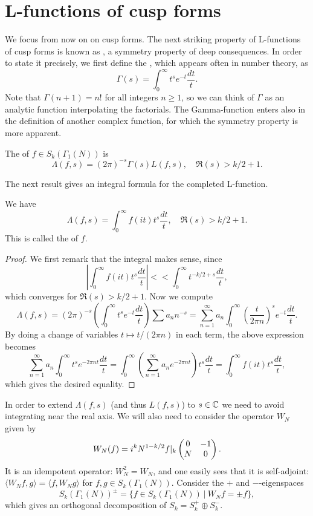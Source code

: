 \section{L-functions of cusp forms}
We focus from now on on cusp forms. The next striking property of L-functions of cusp forms is known as , a symmetry property of deep consequences. In order to state it precisely, we first define the , which appears often in number theory, as
\[
\Gamma(s)=\int_0^\infty t^s e^{-t}\frac{dt}{t}.
\]
Note that $\Gamma(n+1)= n!$ for all integers $n\geq 1$, so we can think of $\Gamma$ as an analytic function interpolating the factorials. The Gamma-function enters also in the definition of another complex function, for which the symmetry property is more apparent.
\begin{definition}
  The  of $f\in S_k(\Gamma_1(N))$ is
\[
\Lambda(f,s)=(2\pi)^{-s}\Gamma(s)L(f,s),\quad \Re(s)>k/2+1.
\]
\end{definition}
The next result gives an integral formula for the completed L-function.
\begin{proposition}
  We have
\[
\Lambda(f,s)=\int_0^\infty f(it)t^s\frac{dt}{t},\quad \Re(s)>k/2+1.
\]
This is called the  of $f$.
\end{proposition}
\begin{proof}
  We first remark that the integral makes sense, since
\[
\left|\int_0^\infty f(it)t^s\frac{dt}{t}\right| <\!\!\!\!< \int_0^\infty t^{-k/2+s} \frac{dt}{t},
\]
which converges for $\Re(s)>k/2+1$. Now we compute
\[
\Lambda(f,s) = (2\pi)^{-s} \left(\int_0^\infty t^s e^{-t}\frac{dt}{t}\right)\sum a_n n^{-s} = \sum_{n=1}^\infty a_n\int_0^\infty \left(\frac{t}{2\pi n}\right)^s e^{-t}\frac{dt}{t}.
\]
By doing a change of variables $t\mapsto t/(2\pi n)$ in each term, the above expression becomes
\[
\sum_{n=1}^\infty a_n\int_0^\infty t^s e^{-2\pi n t}\frac{dt}{t} = \int_0^\infty \left(\sum_{n=1}^\infty a_n e^{-2\pi nt}\right) t^s\frac{dt}{t} = \int_0^\infty f(it)t^s\frac{dt}{t},
\]
which gives the desired equality.
\end{proof}

In order to extend $\Lambda(f,s)$ (and thus $L(f,s)$) to $s\in\mathbb{C}$ we need to avoid integrating near the real axis. We will also need to consider the operator $W_N$ given by
\[
W_N(f)= i^k N^{1-k/2} f|_k \left(\begin{matrix}0&-1\\N&0\end{matrix}\right).
\]
It is an idempotent operator: $W_N^2=W_N$, and one easily sees that it is self-adjoint: $\langle W_Nf,g\rangle = \langle f,W_Ng\rangle$ for $f,g\in S_k(\Gamma_1(N))$. Consider the $+$ and $-$-eigenspaces
\[
S_k(\Gamma_1(N))^{\pm} = \{f\in S_k(\Gamma_1(N)) ~|~ W_Nf = \pm f\},
\]
which gives an orthogonal decomposition of $S_k = S_k^+\oplus S_k^-$.

